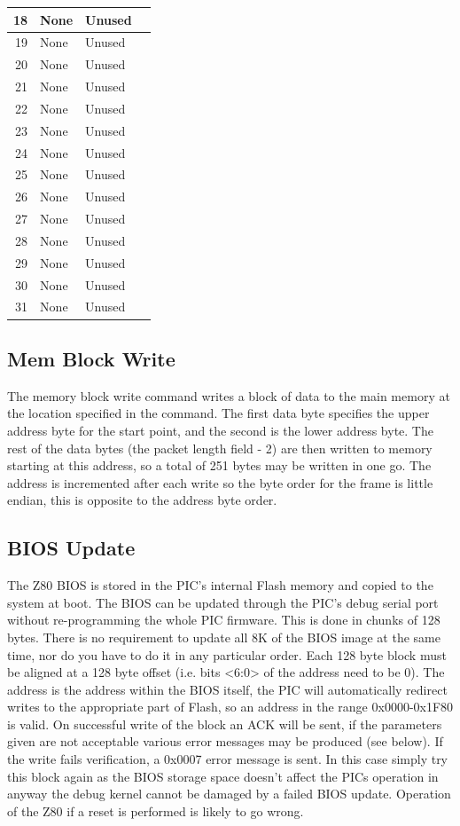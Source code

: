 \documentclass[a4paper,10pt]{book}
\begin{document}
\begin{tabular}{|r|l|p{3cm}|p{4.5cm}|}
\hline
 18&None&Unused&\\
\hline
 19&None&Unused&\\
\hline
 20&None&Unused&\\
\hline
 21&None&Unused&\\
\hline
 22&None&Unused&\\
\hline
 23&None&Unused&\\
\hline
 24&None&Unused&\\
\hline
 25&None&Unused&\\
\hline
 26&None&Unused&\\
\hline
 27&None&Unused&\\
\hline
 28&None&Unused&\\
\hline
 29&None&Unused&\\
\hline
 30&None&Unused&\\
\hline
 31&None&Unused&\\
\hline
\end{tabular}

\subsection{Mem Block Write}
The memory block write command writes a block of data to the main memory at the location specified in the command.  The first data byte specifies the upper address byte for the start point, and the second is the lower address byte.  The rest of the data bytes (the packet length field - 2) are then written to memory starting at this address, so a total of 251 bytes may be written in one go.  The address is incremented after each write so the byte order for the frame is little endian, this is opposite to the address byte order.

\subsection{BIOS Update}
The Z80 BIOS is stored in the PIC's internal Flash memory and copied to the system at boot.  The BIOS can be updated through the PIC's debug serial port without re-programming the whole PIC firmware.  This is done in chunks of 128 bytes.  There is no requirement to update all 8K of the BIOS image at the same time, nor do you have to do it in any particular order.  Each 128 byte block must be aligned at a 128 byte offset (i.e. bits <6:0> of the address need to be 0).  The address is the address within the BIOS itself, the PIC will automatically redirect writes to the appropriate part of Flash, so an address in the range 0x0000-0x1F80 is valid. On successful write of the block an ACK will be sent, if the parameters given are not acceptable various error messages may be produced (see below).  If the write fails verification, a 0x0007 error message is sent.  In this case simply try this block again as the BIOS storage space doesn't affect the PICs operation in anyway the debug kernel cannot be damaged by a failed BIOS update.  Operation of the Z80 if a reset is performed is likely to go wrong.
\end{document}

